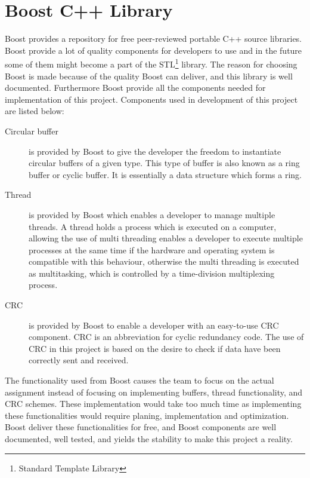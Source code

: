 \chapter{Boost C++ Library}\label{app:boost}
Boost provides a repository for free peer-reviewed portable C++ source libraries. Boost provide a lot of quality components for developers to use and in the future some of them might become a part of the STL\footnote{Standard Template Library} library. The reason for choosing Boost is made because of the quality Boost can deliver, and this library is well documented. Furthermore Boost provide all the components needed for implementation of this project. Components used in development of this project are listed below:

\begin{description}
\item[Circular buffer]
is provided by Boost to give the developer the freedom to instantiate circular buffers of a given type. This type of buffer is also known as a ring buffer or cyclic buffer. It is essentially a data structure which forms a ring. 

\item[Thread]
is provided by Boost which enables a developer to manage multiple threads. A thread holds a process which is executed on a computer, allowing the use of multi threading enables a developer to execute multiple processes at the same time if the hardware and operating system is compatible with this behaviour, otherwise the multi threading is executed as multitasking, which is controlled by a time-division multiplexing process.

\item[CRC]
is provided by Boost to enable a developer with an easy-to-use CRC component. CRC is an abbreviation for cyclic redundancy code. The use of CRC in this project is based on the desire to check if data have been correctly sent and received.
\end{description}

The functionality used from Boost causes the team to focus on the actual assignment instead of focusing on implementing buffers, thread functionality, and CRC schemes. These implementation would take too much time as implementing these functionalities would require planing, implementation and optimization. Boost deliver these functionalities for free, and Boost components are well documented, well tested, and yields the stability to make this project a reality.